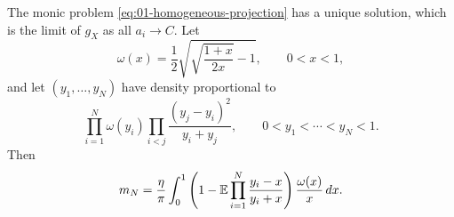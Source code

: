 \begin{lemma}
\label{lem:positive-integral}
The monic problem \eqref{eq:01-homogeneous-projection} has a unique
solution, which is the limit of $g_X$ as all $a_i\to C$.
Let
\begin{equation}\label{eq:01-omega}
 \omega(x)=\frac12\sqrt{\sqrt{\frac{1+x}{2x}}-1},\qquad 0<x<1,
\end{equation}
and let $(y_1,\ldots,y_N)$ have density proportional to
\begin{equation}\label{eq:01-positive-law}
 \prod_{i=1}^N\omega(y_i)
 \prod_{i<j}\frac{(y_j-y_i)^2}{y_i+y_j},
 \qquad 0<y_1<\cdots<y_N<1.
\end{equation}
Then
\begin{equation}\label{eq:01-moment-integral}
 m_N=\frac\eta\pi\int_0^1
  \left(1-\mathbb E\prod_{i=1}^N\frac{y_i-x}{y_i+x}\right)
  \frac{\omega(x)}x\,dx.
\end{equation}
\end{lemma}


